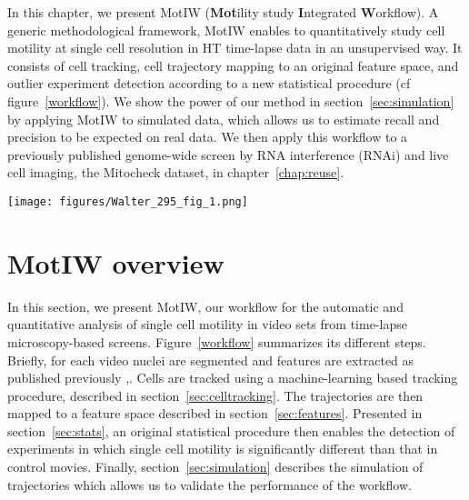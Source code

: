 
In this chapter, we present MotIW (\textbf{Mot}ility study \textbf{I}ntegrated \textbf{W}orkflow). A generic methodological framework, MotIW enables to quantitatively study cell motility at single cell resolution in HT time-lapse data in an unsupervised way. It consists of cell tracking, cell trajectory mapping to an original feature space, and outlier experiment detection according to a new statistical procedure (cf figure~\ref{workflow}). We show the power of our method in section~\ref{sec:simulation} by applying MotIW to simulated data, which allows us to estimate recall and precision to be expected on real data. We then apply this workflow to a previously published genome-wide
screen by RNA interference (RNAi) and live cell imaging, the Mitocheck dataset, in chapter~\ref{chap:reuse}.

\begin{figure*}[ht]
\centerline{\texttt{[image: figures/Walter\_295\_fig\_1.png]}}
\caption{Overview of MotIW}
\label{workflow}
\end{figure*}  

\section{MotIW overview}
\label{sec:workflow}
In this section, we present MotIW, our workflow for the automatic and
quantitative analysis of single cell motility in video sets from
time-lapse microscopy-based screens. Figure~\ref{workflow} summarizes
its different steps. 
Briefly, for each video nuclei are segmented and features are
extracted as published previously \cite{Walter2010},\cite{cellcognition}. Cells are tracked using a
machine-learning based tracking procedure, described in
section~\ref{sec:celltracking}. The trajectories are then mapped to a
feature space described in section~\ref{sec:features}. Presented in
section~\ref{sec:stats}, an original statistical procedure then
enables the detection of experiments in which single cell motility is
significantly different than that in control movies. Finally,
section~\ref{sec:simulation} describes the simulation of trajectories
which allows us to validate the performance of the workflow.

